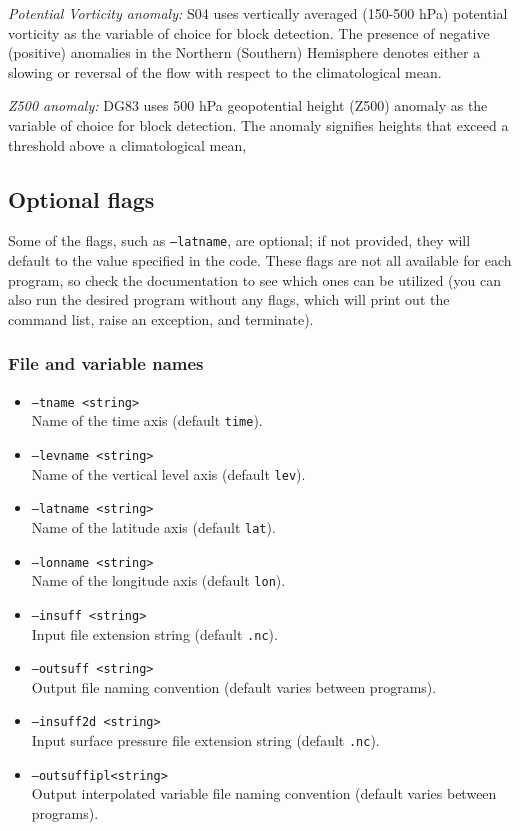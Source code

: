 \documentclass{article}
\begin{document}
\textit{Potential Vorticity anomaly:} S04 uses vertically averaged (150-500 hPa) potential vorticity as the variable of choice for block detection. The presence of negative (positive) anomalies in the Northern (Southern) Hemisphere denotes either a slowing or reversal of the flow with respect to the climatological mean. 

\textit{Z500 anomaly:} DG83 uses 500 hPa geopotential height (Z500) anomaly as the variable of choice for block detection. The anomaly signifies heights that exceed a threshold above a climatological mean, 

\subsection{Optional flags}

Some of the flags, such as \texttt{--latname}, are optional; if not provided, they will default to the value specified in the code. These flags are not all available for each program, so check the documentation to see which ones can be utilized (you can also run the desired program without any flags, which will print out the command list, raise an exception, and terminate).

\subsubsection{File and variable names}
\begin{itemize}
\item[] \texttt{--tname <string>}\\Name of the time axis (default \texttt{time}).
\item[] \texttt{--levname <string>}\\Name of the vertical level axis (default \texttt{lev}).
\item[]\texttt{--latname <string>}\\Name of the latitude axis (default \texttt{lat}).
\item[]\texttt{--lonname <string>}\\Name of the longitude axis (default \texttt{lon}).
\item[]\texttt{--insuff <string>}\\Input file extension string (default \texttt{.nc}).
\item[]\texttt{--outsuff <string>}\\Output file naming convention (default varies between programs).
\item[]\texttt{--insuff2d <string>}\\Input surface pressure file extension string (default \texttt{.nc}).
\item[] \texttt{--outsuffipl<string>}\\Output interpolated variable file naming convention (default varies between programs).
\end{itemize}
\end{document}
